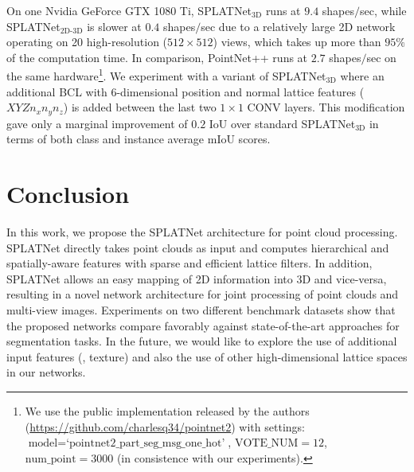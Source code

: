 \documentclass[10pt,twocolumn,letterpaper]{article}
\def\modelthree{SPLATNet$_{\text{3D}}$\xspace}
\def\modeljoint{SPLATNet$_{\text{2D-3D}}$\xspace}
\newcommand{\hscomment}[1]{{\bf \textcolor{magenta}{HS: #1}}}
\newcommand{\camreadycomment}[1]{{\textcolor{red}{#1}}}
\begin{document}
On one Nvidia GeForce GTX 1080 Ti, \modelthree{} runs at $9.4$ shapes$/$sec, while \modeljoint{} is slower at $0.4$ shapes$/$sec due to a relatively large 2D network
operating on 20 high-resolution ($512\times512$) views, which takes up more than $95\%$ of the computation time. In comparison, PointNet++ runs at $2.7$ shapes$/$sec on the same hardware\footnote{We use the public implementation released by the authors (\url{https://github.com/charlesq34/pointnet2}) with settings: $\text{model}=\text{`pointnet2\_part\_seg\_msg\_one\_hot'}$, $\text{VOTE\_NUM}=12$, $\text{num\_point}=3000$ (in consistence with our experiments).}.
We experiment with a variant of \modelthree where an 
additional BCL with 6-dimensional position and normal lattice features ($XYZn_xn_yn_z$) is added between the last two $1\times1$ CONV layers. This modification gave only a marginal improvement of
$0.2$ IoU over standard \modelthree in terms of both class and instance average mIoU scores.


\section{Conclusion}\label{sec:conclusion}

In this work, we propose the SPLATNet architecture for point cloud processing. SPLATNet directly takes point clouds as input and computes hierarchical and spatially-aware features with sparse and efficient lattice filters. In addition, SPLATNet allows an easy mapping of 2D information into 3D and vice-versa, resulting in a novel network architecture for joint processing of point clouds and multi-view images. Experiments on two different benchmark datasets show that the proposed networks compare favorably against state-of-the-art approaches for segmentation tasks. In the future, we would like to explore the use of additional input features (\eg, texture) and also the use of other high-dimensional lattice spaces in our networks.
\end{document}

